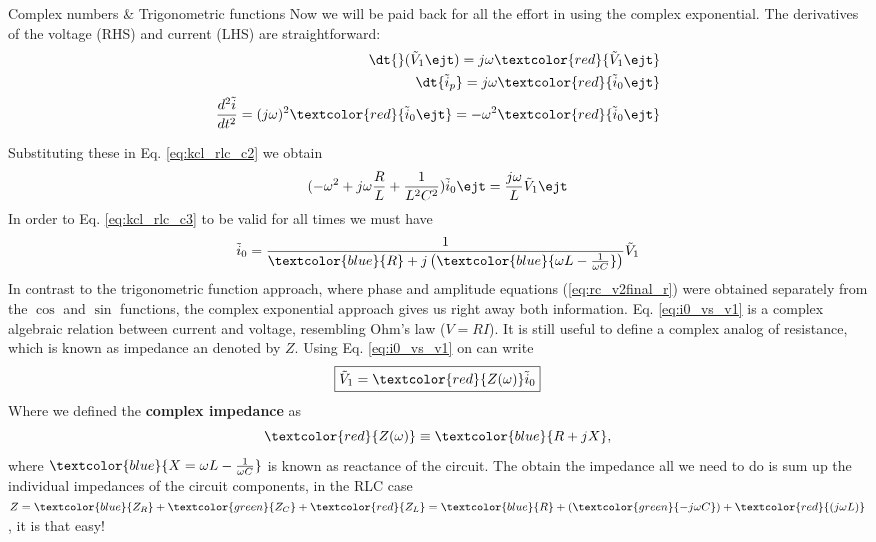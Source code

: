 \begin{frame}[allowframebreaks]{Complex numbers \& Trigonometric functions}
Now we will be paid back for all the effort in using the complex exponential. The derivatives of the voltage (RHS)  and current (LHS) are straightforward:
\begin{eqnarray}
\dt{ }(\tilde{V}_1\ejt) = j \omega \textcolor{red}{\tilde{V}_1 \ejt}\\
\dt{\tilde{i}_p}=j \omega \textcolor{red}{\tilde{i}_0 \ejt}\\
\frac{d^2\tilde{i}}{dt^2}=(j \omega)^2 \textcolor{red}{\tilde{i}_0 \ejt}= -\omega^2 \textcolor{red}{\tilde{i}_0 \ejt}
\end{eqnarray}


Substituting these in Eq. \ref{eq:kcl_rlc_c2} we obtain
\begin{equation}
	(-\omega^2 + j\omega \frac{R}{L} +\frac{1}{L^2 C^2})\tilde{i}_0 \ejt = \frac{j \omega}{L}\tilde{V}_1 \ejt
	\label{eq:kcl_rlc_c3}
\end{equation}
In order to Eq. \ref{eq:kcl_rlc_c3} to be valid for all times we must have
\begin{equation}
	\tilde{i}_0=\frac{1}{\textcolor{blue}{R}+j\left(\textcolor{blue}{\omega L-\frac{1}{\omega C}}\right)}\tilde{V}_1
	\label{eq:i0_vs_v1}
\end{equation}
In contrast to the trigonometric function approach, where phase and amplitude equations (\ref{eq:rc_v2final_r}) were obtained separately from the $\cos$ and $\sin$ functions, the complex exponential approach gives us right away both information. 
Eq. \ref{eq:i0_vs_v1} is a complex algebraic relation between current and voltage, resembling Ohm's law ($V=RI$). It is still useful to define a complex analog of resistance, which is known as impedance an denoted by $Z$. Using Eq. \ref{eq:i0_vs_v1} on can write
\begin{equation}
	\boxed{
	\tilde{V}_1=\textcolor{red}{Z(\omega)} \tilde{i}_0
	}
	\label{eq:complex_impedance}
\end{equation}
Where we defined the \textbf{complex impedance} as 
\begin{equation}
\textcolor{red}{Z(\omega)}\equiv \textcolor{blue}{R+jX},
\end{equation}
where $\textcolor{blue}{X=\omega L-\frac{1}{\omega C}}$ is known as reactance of the circuit. The obtain the impedance all we need to do is sum up the individual impedances of the circuit components, in the RLC case $Z=\textcolor{blue}{Z_R}+\textcolor{green}{Z_C}+\textcolor{red}{Z_L}=\textcolor{blue}{R} + (\textcolor{green}{-j\omega C})+\textcolor{red}{(j\omega L)}$, it is that easy!


\end{frame}
